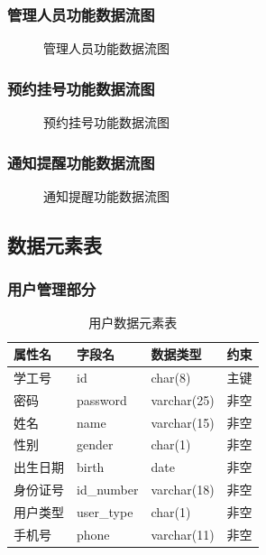 \documentclass{article}
\begin{document}
\subsubsection{管理人员功能数据流图}

\begin{figure}[H]
    \centering
    \caption{管理人员功能数据流图}
\end{figure}

\subsubsection{预约挂号功能数据流图}

\begin{figure}[H]
    \centering
    \caption{预约挂号功能数据流图}
\end{figure}

\subsubsection{通知提醒功能数据流图}

\begin{figure}[H]
    \centering
    \caption{通知提醒功能数据流图}
\end{figure}

\subsection{数据元素表}
\subsubsection{用户管理部分}

\begin{table}[H]
    \centering
    \begin{tabularx}{\textwidth}{|>{\raggedright\arraybackslash}X|>{\raggedright\arraybackslash}X|>{\raggedright\arraybackslash}X|>{\raggedright\arraybackslash}X|}
    \toprule
    \textbf{属性名} & \textbf{字段名} & \textbf{数据类型} & \textbf{约束} \\ \midrule
    学工号 & id & char(8) & 主键 \\ \midrule
    密码 & password & varchar(25) & 非空 \\ \midrule
    姓名 & name & varchar(15) & 非空 \\ \midrule
    性别 & gender & char(1) & 非空 \\ \midrule
    出生日期 & birth & date & 非空 \\ \midrule
    身份证号 & id\_number & varchar(18) & 非空 \\ \midrule
    用户类型 & user\_type & char(1) & 非空 \\ \midrule
    手机号 & phone & varchar(11) & 非空 \\ \bottomrule
    \end{tabularx}
    \caption{用户数据元素表}
    \label{tab:student_user_elements}
\end{table}
\end{document}
